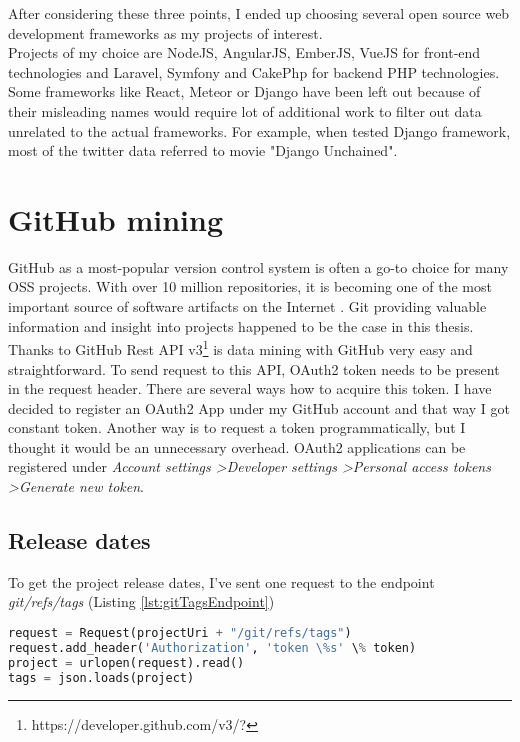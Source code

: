 After considering these three points, I ended up choosing several open source web development frameworks as my projects of interest. \\
Projects of my choice are NodeJS, AngularJS, EmberJS, VueJS for front-end technologies and Laravel, Symfony and CakePhp for backend PHP technologies. Some frameworks like  React, Meteor or Django have been left out because of their misleading names  would require lot of additional work to filter out data unrelated to the actual frameworks. For example, when tested Django framework, most of the twitter data referred to movie "Django Unchained".

\section{GitHub mining}
GitHub as a most-popular version control system is often a go-to choice for many OSS projects. With over 10 million repositories, it is becoming one of the most important source of software artifacts on the Internet \cite{russell2013mining}. Git providing valuable information and insight into projects happened to be the case in this thesis.\\
Thanks to GitHub Rest API v3\footnote{https://developer.github.com/v3/?} is data mining with GitHub very easy and straightforward. To send request to this API, OAuth2 token needs to be present in the request header. There are several ways how to acquire this token. I have decided to register an OAuth2 App under my GitHub account and that way I got constant token. Another way is to request a token programmatically, but I thought it would be an unnecessary overhead. OAuth2 applications can be registered under \textit{Account settings \textgreater Developer settings \textgreater Personal access tokens \textgreater Generate new token}.
\subsection{Release dates} \label{ssec:gitReleaseDatesMining}
To get the project release dates, I've sent one request to the endpoint \textit{git/refs/tags} (Listing \ref{lst:gitTagsEndpoint})

\begin{lstlisting}[caption={Requesting all project tags git API tags endpoint},label={lst:gitTagsEndpoint},language=Python]
request = Request(projectUri + "/git/refs/tags")
request.add_header('Authorization', 'token \%s' \% token)
project = urlopen(request).read()
tags = json.loads(project)
\end{lstlisting}

